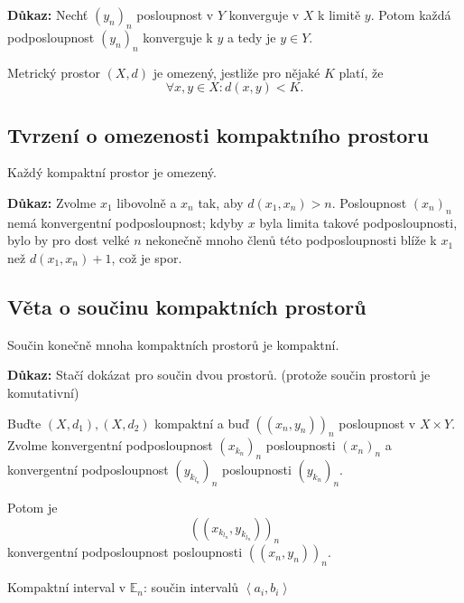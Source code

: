 \documentclass[../main.tex]{subfiles}
\begin{document}
\vspace{5mm}
\noindent
\textbf{Důkaz:} Nechť $(y_n)_n$ posloupnost v $Y$ konverguje v $X$ k limitě $y$. Potom každá podposloupnost $(y_n)_n$ konverguje k 
$y$ a tedy je $y \in Y$.
\begin{center}
    Metrický prostor $(X,d)$ je omezený, jestliže pro nějaké $K$ platí, že 
    \[\forall x,y \in X : d(x,y) < K.\]
\end{center}

\subsection{Tvrzení o omezenosti kompaktního prostoru} \label{ch:komp=>om}
\hspace{1.2mm}
\noindent
Každý kompaktní prostor je omezený.

\vspace{5mm}
\noindent
\textbf{Důkaz:} Zvolme $x_1$ libovolně a $x_n$ tak, aby $d(x_1,x_n) > n$. Posloupnost $(x_n)_n$ nemá konvergentní podposloupnost; kdyby $x$
byla limita takové podposloupnosti, bylo by pro dost velké $n$ nekonečně mnoho členů této podposloupnosti blíže k $x_1$ než $d(x_1,x_n)+1$, což je spor.

\subsection{Věta o součinu kompaktních prostorů}
\hspace{1.2mm}
\noindent
Součin konečně mnoha kompaktních prostorů je kompaktní.

\vspace{5mm}
\noindent
\textbf{Důkaz:} Stačí dokázat pro součin dvou prostorů. (protože součin prostorů je komutativní)

Buďte $(X,d_1), (X, d_2)$ kompaktní a buď $((x_n,y_n))_n$ posloupnost v $X \times Y$. 
Zvolme konvergentní podposloupnost $(x_{k_n})_n$ posloupnosti $(x_n)_n$ a konvergentní podposloupnost $(y_{k_{l_n}})_n$ posloupnosti $(y_{k_n})_n$.

Potom je 
\[((x_{k_{l_n}},y_{k_{l_n}}))_n\]
konvergentní podposloupnost posloupnosti $((x_n,y_n))_n$.

\begin{center}
    Kompaktní interval v $\mathbb{E}_n$: součin intervalů $\left<a_i,b_i\right>$
\end{center}
\end{document}
